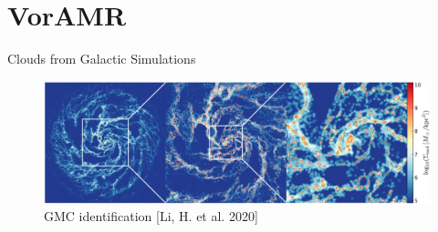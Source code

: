 \documentclass[aspectratio=169]{beamer}
\begin{document}
\section{VorAMR}
%
%
% 
\begin{frame}{Clouds from Galactic Simulations}
	\begin{figure}[h!]
                \centering
                \includegraphics[width=\linewidth]{../images/AREPO_galaxy.png} \\
                GMC identification [Li, H. et al. 2020]
                \label{fig:arepo_galaxy}
	\end{figure}
\end{frame}
%
%
%
%
%
\end{document}
